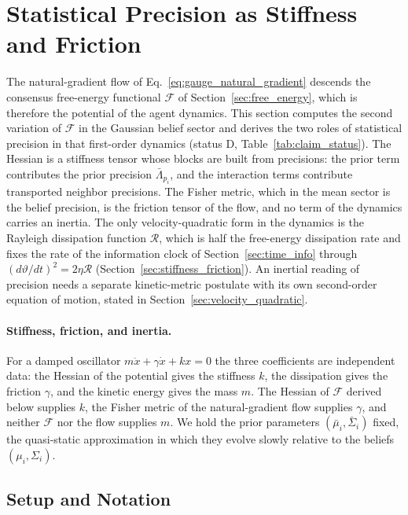 \section{Statistical Precision as Stiffness and Friction}\label{sec:mass}

The natural-gradient flow of Eq.~\eqref{eq:gauge_natural_gradient} descends the consensus free-energy functional $\mathcal{F}$ of Section~\ref{sec:free_energy}, which is therefore the potential of the agent dynamics. This section computes the second variation of $\mathcal{F}$ in the Gaussian belief sector and derives the two roles of statistical precision in that first-order dynamics (status D, Table~\ref{tab:claim_status}). The Hessian is a stiffness tensor whose blocks are built from precisions: the prior term contributes the prior precision $\bar{\Lambda}_{p_i}$, and the interaction terms contribute transported neighbor precisions. The Fisher metric, which in the mean sector is the belief precision, is the friction tensor of the flow, and no term of the dynamics carries an inertia. The only velocity-quadratic form in the dynamics is the Rayleigh dissipation function $\mathcal{R}$, which is half the free-energy dissipation rate and fixes the rate of the information clock of Section~\ref{sec:time_info} through $(d\vartheta/dt)^2 = 2\eta\mathcal{R}$ (Section~\ref{sec:stiffness_friction}). An inertial reading of precision needs a separate kinetic-metric postulate with its own second-order equation of motion, stated in Section~\ref{sec:velocity_quadratic}.

\paragraph{Stiffness, friction, and inertia.} For a damped oscillator $m\ddot{x} + \gamma\dot{x} + kx = 0$ the three coefficients are independent data: the Hessian of the potential gives the stiffness $k$, the dissipation gives the friction $\gamma$, and the kinetic energy gives the mass $m$. The Hessian of $\mathcal{F}$ derived below supplies $k$, the Fisher metric of the natural-gradient flow supplies $\gamma$, and neither $\mathcal{F}$ nor the flow supplies $m$. We hold the prior parameters $(\bar{\mu}_i, \bar{\Sigma}_i)$ fixed, the quasi-static approximation in which they evolve slowly relative to the beliefs $(\mu_i, \Sigma_i)$.

\subsection{Setup and Notation}

